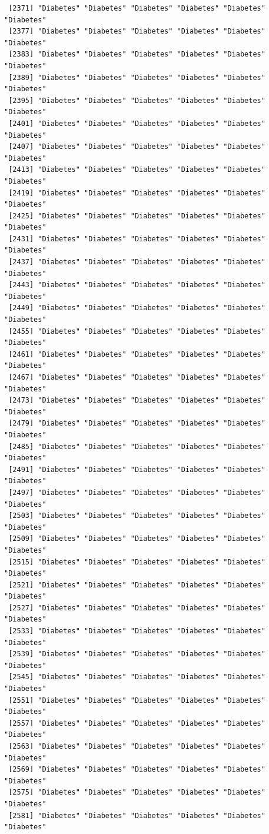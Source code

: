 \documentclass[
  letterpaper,
  DIV=11,
  numbers=noendperiod]{scrartcl}
\begin{document}
\begin{verbatim}
 [2371] "Diabetes" "Diabetes" "Diabetes" "Diabetes" "Diabetes" "Diabetes"
 [2377] "Diabetes" "Diabetes" "Diabetes" "Diabetes" "Diabetes" "Diabetes"
 [2383] "Diabetes" "Diabetes" "Diabetes" "Diabetes" "Diabetes" "Diabetes"
 [2389] "Diabetes" "Diabetes" "Diabetes" "Diabetes" "Diabetes" "Diabetes"
 [2395] "Diabetes" "Diabetes" "Diabetes" "Diabetes" "Diabetes" "Diabetes"
 [2401] "Diabetes" "Diabetes" "Diabetes" "Diabetes" "Diabetes" "Diabetes"
 [2407] "Diabetes" "Diabetes" "Diabetes" "Diabetes" "Diabetes" "Diabetes"
 [2413] "Diabetes" "Diabetes" "Diabetes" "Diabetes" "Diabetes" "Diabetes"
 [2419] "Diabetes" "Diabetes" "Diabetes" "Diabetes" "Diabetes" "Diabetes"
 [2425] "Diabetes" "Diabetes" "Diabetes" "Diabetes" "Diabetes" "Diabetes"
 [2431] "Diabetes" "Diabetes" "Diabetes" "Diabetes" "Diabetes" "Diabetes"
 [2437] "Diabetes" "Diabetes" "Diabetes" "Diabetes" "Diabetes" "Diabetes"
 [2443] "Diabetes" "Diabetes" "Diabetes" "Diabetes" "Diabetes" "Diabetes"
 [2449] "Diabetes" "Diabetes" "Diabetes" "Diabetes" "Diabetes" "Diabetes"
 [2455] "Diabetes" "Diabetes" "Diabetes" "Diabetes" "Diabetes" "Diabetes"
 [2461] "Diabetes" "Diabetes" "Diabetes" "Diabetes" "Diabetes" "Diabetes"
 [2467] "Diabetes" "Diabetes" "Diabetes" "Diabetes" "Diabetes" "Diabetes"
 [2473] "Diabetes" "Diabetes" "Diabetes" "Diabetes" "Diabetes" "Diabetes"
 [2479] "Diabetes" "Diabetes" "Diabetes" "Diabetes" "Diabetes" "Diabetes"
 [2485] "Diabetes" "Diabetes" "Diabetes" "Diabetes" "Diabetes" "Diabetes"
 [2491] "Diabetes" "Diabetes" "Diabetes" "Diabetes" "Diabetes" "Diabetes"
 [2497] "Diabetes" "Diabetes" "Diabetes" "Diabetes" "Diabetes" "Diabetes"
 [2503] "Diabetes" "Diabetes" "Diabetes" "Diabetes" "Diabetes" "Diabetes"
 [2509] "Diabetes" "Diabetes" "Diabetes" "Diabetes" "Diabetes" "Diabetes"
 [2515] "Diabetes" "Diabetes" "Diabetes" "Diabetes" "Diabetes" "Diabetes"
 [2521] "Diabetes" "Diabetes" "Diabetes" "Diabetes" "Diabetes" "Diabetes"
 [2527] "Diabetes" "Diabetes" "Diabetes" "Diabetes" "Diabetes" "Diabetes"
 [2533] "Diabetes" "Diabetes" "Diabetes" "Diabetes" "Diabetes" "Diabetes"
 [2539] "Diabetes" "Diabetes" "Diabetes" "Diabetes" "Diabetes" "Diabetes"
 [2545] "Diabetes" "Diabetes" "Diabetes" "Diabetes" "Diabetes" "Diabetes"
 [2551] "Diabetes" "Diabetes" "Diabetes" "Diabetes" "Diabetes" "Diabetes"
 [2557] "Diabetes" "Diabetes" "Diabetes" "Diabetes" "Diabetes" "Diabetes"
 [2563] "Diabetes" "Diabetes" "Diabetes" "Diabetes" "Diabetes" "Diabetes"
 [2569] "Diabetes" "Diabetes" "Diabetes" "Diabetes" "Diabetes" "Diabetes"
 [2575] "Diabetes" "Diabetes" "Diabetes" "Diabetes" "Diabetes" "Diabetes"
 [2581] "Diabetes" "Diabetes" "Diabetes" "Diabetes" "Diabetes" "Diabetes"

\end{verbatim}
\end{document}
